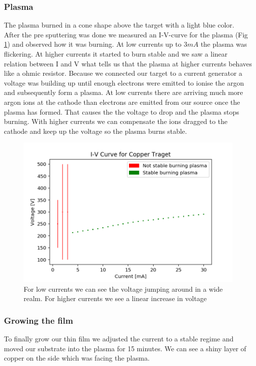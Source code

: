 \documentclass[]{article}
\begin{document}
\subsubsection{Plasma}
The plasma burned in a cone shape above the target with a light blue color. After the pre sputtering was done we measured an I-V-curve for the plasma (Fig \ref{fig:ivcurve}) and observed how it was burning. At low currents up to $3mA$ the plasma was flickering. At higher currents it started to burn stable and we saw a linear relation between I and V what tells us that the plasma at higher currents behaves like a ohmic resistor. Because we connected our target to a current generator a voltage was building up until enough electrons were emitted to ionise the argon and subsequently form a plasma. At low currents there are arriving much more argon ions at the cathode than electrons are emitted from our source once the plasma has formed. That causes the the voltage to drop and the plasma stops burning. With higher currents we can compensate the ions dragged to the cathode and keep up the voltage so the plasma burns stable.

\begin{figure}
	\centering
	\includegraphics[width=.8\linewidth]{Plots/IVcurve}
	\caption{For low currents we can see the voltage jumping around in a wide realm. For higher currents we see a linear increase in voltage}
	\label{fig:ivcurve}
\end{figure}

\subsubsection{Growing the film}
To finally grow our thin film we adjusted the current to a stable regime and moved our substrate into the plasma for 15 minutes. We can see a shiny layer of copper on the side which was facing the plasma.  
\end{document}
